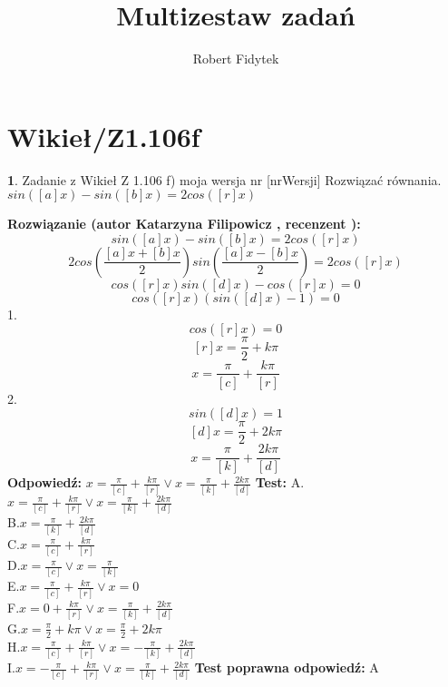 \documentclass[12pt, a4paper]{article}
\title{Multizestaw zadań}
\author{Robert Fidytek}
\date{}
\theoremstyle{definition} %
\newtheorem{zad}{}
\newcommand{\kategoria}[1]{\section{#1}} %
\newcommand{\zadStart}[1]{\begin{zad}#1\newline} %
\newcommand{\zadStop}{\end{zad}}   %
\newcommand{\rozwStart}[2]{\noindent \textbf{Rozwiązanie (autor #1 , recenzent #2): }\newline} %
\newcommand{\rozwStop}{\newline}                                            %
\newcommand{\odpStart}{\noindent \textbf{Odpowiedź:}\newline}    %
\newcommand{\odpStop}{\newline}                                             %
\newcommand{\testStart}{\noindent \textbf{Test:}\newline} %
\newcommand{\testStop}{\newline} %
\newcommand{\kluczStart}{\noindent \textbf{Test poprawna odpowiedź:}\newline} %
\newcommand{\kluczStop}{\newline} %
\begin{document}
\maketitle


\kategoria{Wikieł/Z1.106f}
\zadStart{Zadanie z Wikieł Z 1.106 f) moja wersja nr [nrWersji]}
Rozwiązać równania.\\
 $sin([a]x)-sin([b]x)=2cos([r]x)$
\zadStop
\rozwStart{Katarzyna Filipowicz}{}
$$
sin([a]x)-sin([b]x)=2cos([r]x)
$$
$$
2cos\left(\frac{[a]x+[b]x}{2}\right)sin\left(\frac{[a]x-[b]x}{2}\right)=2cos([r]x)
$$ $$
cos([r]x)sin([d]x)-cos([r]x)=0
$$ $$
cos([r]x)(sin([d]x)-1)=0
$$
1.
 $$
cos([r]x)=0
$$ $$
[r]x=\frac{\pi}{2}+k\pi
$$ $$
 x=\frac{\pi}{[c]}+\frac{k\pi}{[r]}
$$
2.
$$
sin([d]x)=1
$$ $$
[d]x=\frac{\pi}{2}+2k\pi  
$$ $$
x=\frac{\pi}{[k]}+\frac{2k\pi }{[d]} 
$$
\rozwStop
\odpStart
$ x=\frac{\pi}{[c]}+\frac{k\pi}{[r]}  \vee x=\frac{\pi}{[k]}+\frac{2k\pi }{[d]} $
\odpStop
\testStart
A.$ x=\frac{\pi}{[c]}+\frac{k\pi}{[r]}  \vee x=\frac{\pi}{[k]}+\frac{2k\pi }{[d]} $\\
B.$ x=\frac{\pi}{[k]}+\frac{2k\pi }{[d]} $\\
C.$ x=\frac{\pi}{[c]}+\frac{k\pi}{[r]}  $\\
D.$ x=\frac{\pi}{[c]} \vee x=\frac{\pi}{[k]}$\\
E.$ x=\frac{\pi}{[c]}+\frac{k\pi}{[r]}  \vee x=0 $\\
F.$ x=0+\frac{k\pi}{[r]}  \vee x=\frac{\pi}{[k]}+\frac{2k\pi }{[d]} $\\
G.$ x=\frac{\pi}{2}+k\pi  \vee x=\frac{\pi}{2}+2k\pi    $\\
H.$ x=\frac{\pi}{[c]}+\frac{k\pi}{[r]}  \vee x=-\frac{\pi}{[k]}+\frac{2k\pi }{[d]} $\\
I.$ x=-\frac{\pi}{[c]}+\frac{k\pi}{[r]}  \vee x=\frac{\pi}{[k]}+\frac{2k\pi }{[d]} $
\testStop
\kluczStart
A
\kluczStop
\end{document}
